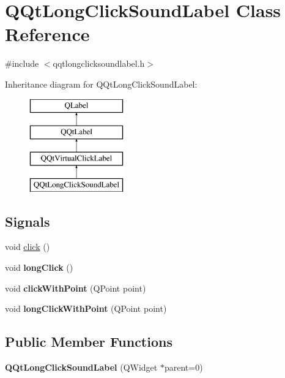 \hypertarget{class_q_qt_long_click_sound_label}{}\section{Q\+Qt\+Long\+Click\+Sound\+Label Class Reference}
\label{class_q_qt_long_click_sound_label}


{\ttfamily \#include $<$qqtlongclicksoundlabel.\+h$>$}

Inheritance diagram for Q\+Qt\+Long\+Click\+Sound\+Label\+:\begin{figure}[H]
\begin{center}
\leavevmode
\includegraphics[height=4.000000cm]{class_q_qt_long_click_sound_label}
\end{center}
\end{figure}
\subsection*{Signals}
\begin{DoxyCompactItemize}
\item 
void \mbox{\hyperlink{class_q_qt_long_click_sound_label_a0992a811265c8b923eba517f790b4308}{click}} ()
\item 
\mbox{\label{class_q_qt_long_click_sound_label_adde116a5518540ac63d85a757e488556}} 
void {\bfseries long\+Click} ()
\item 
\mbox{\label{class_q_qt_long_click_sound_label_a14ce097163140c866781406ff04ba6ac}} 
void {\bfseries click\+With\+Point} (Q\+Point point)
\item 
\mbox{\label{class_q_qt_long_click_sound_label_ace859c8f737378aeeca3829b5c2f73f0}} 
void {\bfseries long\+Click\+With\+Point} (Q\+Point point)
\end{DoxyCompactItemize}
\subsection*{Public Member Functions}
\begin{DoxyCompactItemize}
\item 
\mbox{\label{class_q_qt_long_click_sound_label_a8d2d5d35b7baa724ae091998cd47fc93}} 
{\bfseries Q\+Qt\+Long\+Click\+Sound\+Label} (Q\+Widget $\ast$parent=0)
\end{DoxyCompactItemize}
